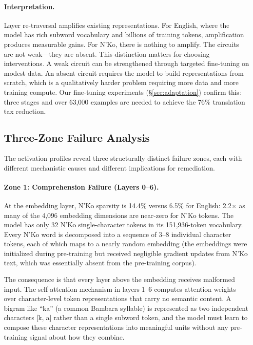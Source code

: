 \documentclass[11pt]{article}
\begin{document}
\paragraph{Interpretation.}
Layer re-traversal amplifies existing representations.
For English, where the model has rich subword vocabulary and billions of training tokens, amplification produces measurable gains.
For N'Ko, there is nothing to amplify.
The circuits are not weak---they are absent.
This distinction matters for choosing interventions.
A weak circuit can be strengthened through targeted fine-tuning on modest data.
An absent circuit requires the model to build representations from scratch, which is a qualitatively harder problem requiring more data and more training compute.
Our fine-tuning experiments (\S\ref{sec:adaptation}) confirm this: three stages and over 63,000 examples are needed to achieve the 76\% translation tax reduction.

\subsection{Three-Zone Failure Analysis}
\label{sec:three-zone}

The activation profiles reveal three structurally distinct failure zones, each with different mechanistic causes and different implications for remediation.

\paragraph{Zone 1: Comprehension Failure (Layers 0--6).}
At the embedding layer, N'Ko sparsity is 14.4\% versus 6.5\% for English: 2.2$\times$ as many of the 4,096 embedding dimensions are near-zero for N'Ko tokens.
The model has only 32 N'Ko single-character tokens in its 151,936-token vocabulary.
Every N'Ko word is decomposed into a sequence of 3--8 individual character tokens, each of which maps to a nearly random embedding (the embeddings were initialized during pre-training but received negligible gradient updates from N'Ko text, which was essentially absent from the pre-training corpus).

The consequence is that every layer above the embedding receives malformed input.
The self-attention mechanism in layers 1--6 computes attention weights over character-level token representations that carry no semantic content.
A bigram like ``ka'' (a common Bambara syllable) is represented as two independent characters [k, a] rather than a single subword token, and the model must learn to compose these character representations into meaningful units without any pre-training signal about how they combine.
\end{document}
